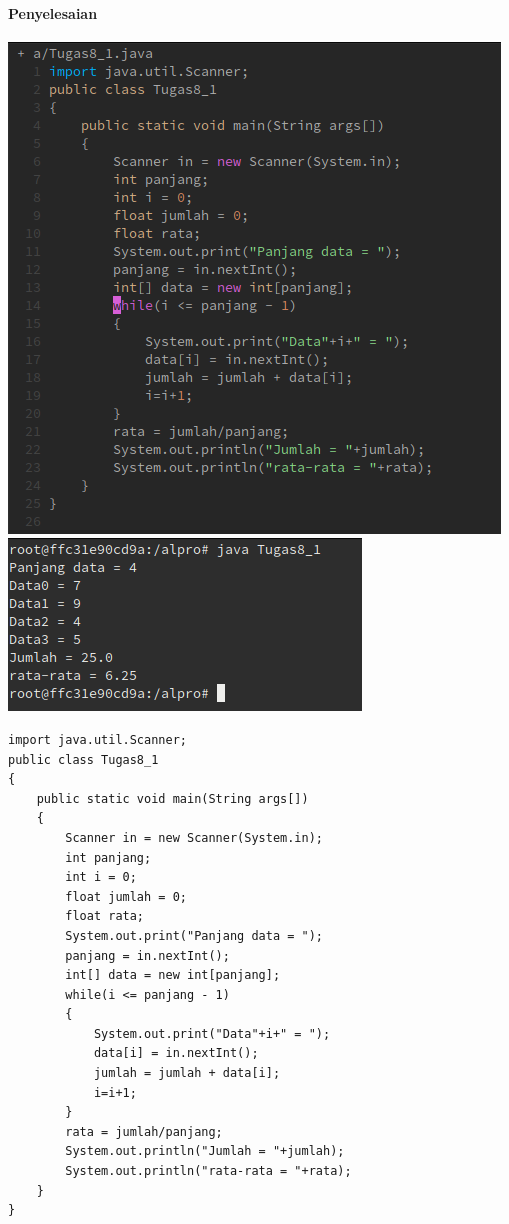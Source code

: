 \documentclass[a4paper,12pt]{article}
\begin{document}
\paragraph{Penyelesaian\\}
\begin{center}
	\includegraphics[scale=.5]{tugas8-1}
	\includegraphics[scale=.8]{tugas8-1-2}
\end{center}
\begin{lstlisting}[frame=single]
import java.util.Scanner;
public class Tugas8_1
{
    public static void main(String args[])
    {
        Scanner in = new Scanner(System.in);
        int panjang;
        int i = 0;
        float jumlah = 0;
        float rata;
        System.out.print("Panjang data = ");
        panjang = in.nextInt();
        int[] data = new int[panjang];
        while(i <= panjang - 1)
        {
            System.out.print("Data"+i+" = ");
            data[i] = in.nextInt();
            jumlah = jumlah + data[i];
            i=i+1;
        }
        rata = jumlah/panjang;
        System.out.println("Jumlah = "+jumlah);
        System.out.println("rata-rata = "+rata);
    }
}
\end{lstlisting}
\end{document}
